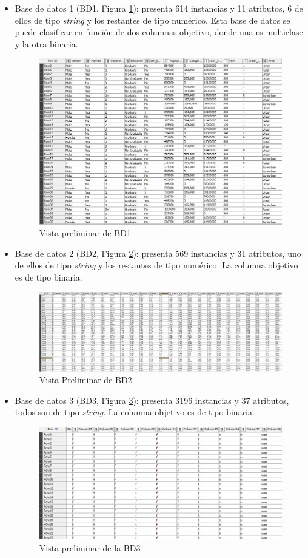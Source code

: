 \begin{itemize}
	\item Base de datos 1 (BD1, Figura \ref{fig:bd1-loan-train}): presenta 614 instancias y 11 atributos, 6 de ellos de tipo \textit{string} y los restantes de tipo numérico. Esta base de datos se puede clasificar en función de dos columnas objetivo, donde una es multiclase y la otra binaria.
	\begin{figure}[H]
		\centering
		\includegraphics[width=0.55\linewidth]{"figuras/capi 3/bd1-loan-train"}
		\caption{Vista preliminar de BD1}
		\label{fig:bd1-loan-train}
	\end{figure}
	
	\item Base de datos 2 (BD2, Figura \ref{fig:bd2-cancer-data}): presenta 569 instancias y 31 atributos, uno de ellos de tipo \textit{string} y los restantes de tipo numérico. La columna objetivo es de tipo binaria.
	\begin{figure}[H]
		\centering
		\includegraphics[width=0.6\linewidth]{"figuras/capi 3/bd2-cancer-data"}
		\caption{Vista Preliminar de BD2}
		\label{fig:bd2-cancer-data}
	\end{figure}

\item Base de datos 3 (BD3, Figura \ref{fig:bd3-kr-vs-kp}): presenta 3196 instancias y 37 atributos, todos son de tipo \textit{string}. La columna objetivo es de tipo binaria.
\begin{figure}[H]
	\centering
	\includegraphics[width=0.6\linewidth]{"figuras/capi 3/bd3-kr-vs-kp"}
	\caption{Vista preliminar de la BD3}
	\label{fig:bd3-kr-vs-kp}
\end{figure}


\end{itemize}
